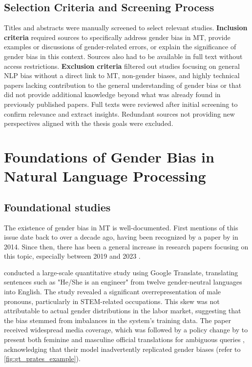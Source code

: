 \subsection{Selection Criteria and Screening Process}\label{subsection:selection_criteria}
Titles and abstracts were manually screened to select relevant studies. \textbf{Inclusion criteria} required sources to specifically address gender bias in MT, provide examples or discussions of gender-related errors, or explain the significance of gender bias in this context. Sources also had to be available in full text without access restrictions. \textbf{Exclusion criteria} filtered out studies focusing on general NLP bias without a direct link to MT, non-gender biases, and highly technical papers lacking contribution to the general understanding of gender bias or that did not provide additional knowledge beyond what was already found in previously published papers. Full texts were reviewed after initial screening to confirm relevance and extract insights. Redundant sources not providing new perspectives aligned with the thesis goals were excluded.

\section{Foundations of Gender Bias in Natural Language Processing}

\subsection{Foundational studies}
The existence of gender bias in MT is well-documented. First mentions of this issue date back to over a decade ago, having been recognized by a paper by \citeauthor{schiebingerScientificResearchMust2014} in 2014. Since then, there has been a general increase in research papers focusing on this topic, especially between 2019 and 2023 \citep{savoldiDecadeGenderBias2025}.

\textbf{\citet{pratesAssessingGenderBias2019}} conducted a large-scale quantitative study using Google Translate, translating sentences such as "He/She is an engineer" from twelve gender-neutral languages into English. The study revealed a significant overrepresentation of male pronouns, particularly in STEM-related occupations. This skew was not attributable to actual gender distributions in the labor market, suggesting that the bias stemmed from imbalances in the system’s training data. The paper received widespread media coverage, which was followed by a policy change by \citeauthor{googleReducingGenderBias2018} to present both feminine and masculine official translations for ambiguous queries \citep{googleReducingGenderBias2018}, acknowledging that their model inadvertently replicated gender biases (refer to \autoref{fig:gt_prates_example}). 

